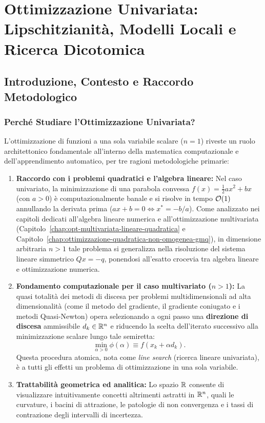 \chapter[Ottimizzazione Univariata: Lipschitz, Modelli Locali e Ricerca Dicotomica]{Ottimizzazione Univariata:\\Lipschitzianit\`a, Modelli Locali e Ricerca Dicotomica}
\label{chap:ottimizzazione-univariata-lipschitz-dicotomica}

\FloatBarrier
\section{Introduzione, Contesto e Raccordo Metodologico}
\label{sec:univariata-intro-contesto}

\subsection{Perch\'e Studiare l'Ottimizzazione Univariata?}
L'ottimizzazione di funzioni a una sola variabile scalare ($n = 1$) riveste un ruolo architettonico fondamentale all'interno della matematica computazionale e dell'apprendimento automatico, per tre ragioni metodologiche primarie:
\begin{enumerate}
    \item \textbf{Raccordo con i problemi quadratici e l'algebra lineare:} Nel caso univariato, la minimizzazione di una parabola convessa $f(x) = \frac{1}{2} a x^2 + b x$ (con $a > 0$) \`e computazionalmente banale e si risolve in tempo $\mathcal{O}\!\left(1\right)$ annullando la derivata prima ($a x + b = 0 \iff x^* = -b/a$). Come analizzato nei capitoli dedicati all'algebra lineare numerica e all'ottimizzazione multivariata (Capitolo~\ref{chap:opt-multivariata-lineare-quadratica} e Capitolo~\ref{chap:ottimizzazione-quadratica-non-omogenea-gmq}), in dimensione arbitraria $n > 1$ tale problema si generalizza nella risoluzione del sistema lineare simmetrico $Q x = -q$, ponendosi all'esatto crocevia tra algebra lineare e ottimizzazione numerica.
    \item \textbf{Fondamento computazionale per il caso multivariato ($n > 1$):} La quasi totalit\`a dei metodi di discesa per problemi multidimensionali ad alta dimensionalit\`a (come il metodo del gradiente, il gradiente coniugato e i metodi Quasi-Newton) opera selezionando a ogni passo una \textbf{direzione di discesa} ammissibile $d_k \in \mathbb{R}^n$ e riducendo la scelta dell'iterato successivo alla minimizzazione scalare lungo tale semiretta:
    \begin{equation}
        \min_{\alpha > 0} \phi(\alpha) \equiv f(x_k + \alpha d_k).
        \label{eq:line-search-univariate-bridge}
    \end{equation}
    Questa procedura atomica, nota come \textit{line search} (ricerca lineare univariata), \`e a tutti gli effetti un problema di ottimizzazione in una sola variabile.
    \item \textbf{Trattabilit\`a geometrica ed analitica:} Lo spazio $\mathbb{R}$ consente di visualizzare intuitivamente concetti altrimenti astratti in $\mathbb{R}^n$, quali le curvature, i bacini di attrazione, le patologie di non convergenza e i tassi di contrazione degli intervalli di incertezza.
\end{enumerate}

